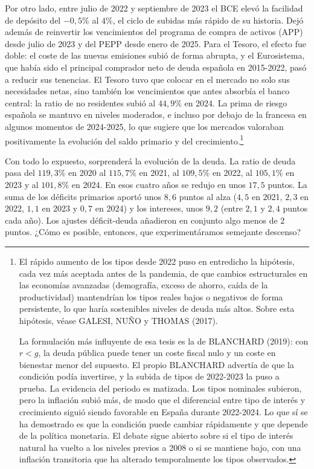 \documentclass[10pt,a4paper]{article}
\begin{document}
Por otro lado, entre julio de 2022 y septiembre de 2023 el BCE elevó la facilidad de depósito del $-0,5\%$ al $4\%$, el ciclo de subidas más rápido de su historia. Dejó además de reinvertir los vencimientos del programa de compra de activos (APP) desde julio de 2023 y del PEPP desde enero de 2025. Para el Tesoro, el efecto fue doble: el coste de las nuevas emisiones subió de forma abrupta, y el Eurosistema, que había sido el principal comprador neto de deuda española en 2015-2022, pasó a reducir sus tenencias. El Tesoro tuvo que colocar en el mercado no solo sus necesidades netas, sino también los vencimientos que antes absorbía el banco central: la ratio de no residentes subió al $44,9\%$ en 2024. La prima de riesgo española se mantuvo en niveles moderados, e incluso por debajo de la francesa en algunos momentos de 2024-2025, lo que sugiere que los mercados valoraban positivamente la evolución del saldo primario y del crecimiento.\footnote{%
    El rápido aumento de los tipos desde 2022 puso en entredicho la hipótesis, cada vez más aceptada antes de la pandemia, de que cambios estructurales en las economías avanzadas (demografía, exceso de ahorro, caída de la productividad) mantendrían los tipos reales bajos o negativos de forma persistente, lo que haría sostenibles niveles de deuda más altos. Sobre esta hipótesis, véase GALESI, NUÑO y THOMAS (2017).

La formulación más influyente de esa tesis es la de BLANCHARD (2019): con $r < g$, la deuda pública puede tener un coste fiscal nulo y un coste en bienestar menor del supuesto. El propio BLANCHARD advertía de que la condición podía invertirse, y la subida de tipos de 2022-2023 la puso a prueba. La evidencia del periodo es matizada. Los tipos nominales subieron, pero la inflación subió más, de modo que el diferencial entre tipo de interés y crecimiento siguió siendo favorable en España durante 2022-2024. Lo que sí se ha demostrado es que la condición puede cambiar rápidamente y que depende de la política monetaria. El debate sigue abierto sobre si el tipo de interés natural ha vuelto a los niveles previos a 2008 o si se mantiene bajo, con una inflación transitoria que ha alterado temporalmente los tipos observados.
}

Con todo lo expuesto, sorprenderá la evolución de la deuda. La ratio de deuda pasa del $119,3\%$ en 2020 al $115,7\%$ en 2021, al $109,5\%$ en 2022, al $105,1\%$ en 2023 y al $101,8\%$ en 2024. En esos cuatro años se redujo en unos $17,5$ puntos. La suma de los déficits primarios aportó unos $8,6$ puntos al alza ($4,5$ en 2021, $2,3$ en 2022, $1,1$ en 2023 y $0,7$ en 2024) y los intereses, unos $9,2$ (entre $2,1$ y $2,4$ puntos cada año). Los ajustes déficit-deuda añadieron en conjunto algo menos de $2$ puntos. ¿Cómo es posible, entonces, que experimentáramos semejante descenso?
\end{document}
